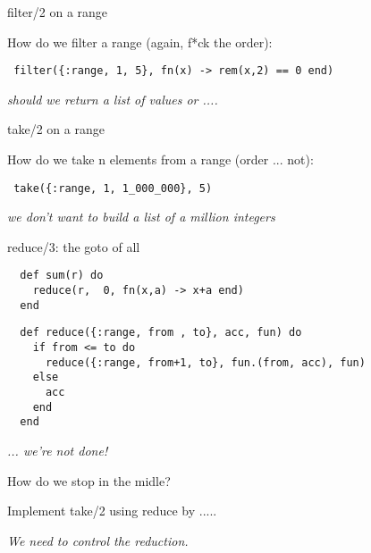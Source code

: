 \begin{frame}[fragile]{filter/2 on a range}

  How do we filter a range (again, f*ck the order):  \pause

  \vspace{20pt}

  \verb+ filter({:range, 1, 5}, fn(x) -> rem(x,2) == 0 end)+ \pause

  \vspace{20pt}
  {\em should we return a list of values or ....}

\end{frame}

\begin{frame}[fragile]{take/2 on a range}

  How do we take n elements from a range (order ... not):  \pause

  \vspace{20pt}

  \verb+ take({:range, 1, 1_000_000}, 5)+ \pause

  \vspace{20pt}

  {\em we don't want to build a list of a million integers}


\end{frame}


\begin{frame}[fragile]{reduce/3: the goto of all}

\begin{verbatim}
  def sum(r) do
    reduce(r,  0, fn(x,a) -> x+a end)
  end
\end{verbatim}

  \vspace{10pt}
  
\begin{verbatim}
  def reduce({:range, from , to}, acc, fun) do
    if from <= to do
      reduce({:range, from+1, to}, fun.(from, acc), fun)
    else
      acc
    end
  end
\end{verbatim}

  \vspace{20pt}\pause

  {\em ... we're not done!}
  
\vspace{20pt}  \pause
\end{frame}

\begin{frame}{How do we stop in the midle?}

  Implement take/2 using reduce by ..... 

  \vspace{20pt}\pause
  {\em We need to control the reduction.}
  
\end{frame}


